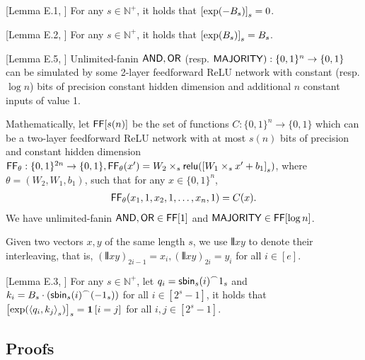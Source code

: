%

\begin{lemma}\label{lem:exp_rounding}[Lemma E.1, \citep{li2024chain}]
	For any $s\in\mathbb{N}^+$, it holds that $\left[\exp(-B_s)\right]_s = 0$.
\end{lemma}

\begin{lemma}\label{lem:exp_rounding_up}[Lemma E.2, \citep{li2024chain}]
	For any $s\in\mathbb{N}^+$, it holds that $\left[\exp(B_s)\right]_s = B_s$.
\end{lemma}

\begin{lemma}\label{lem:FB_simulating_boolean_gates}[Lemma E.5, \citep{li2024chain}]
Unlimited-fanin $\mathsf{AND},\mathsf{OR}$ (resp. $\mathsf{MAJORITY}) :\{0,1\}^n\to \{0,1\}$ can be simulated by some 2-layer feedforward ReLU network with constant (resp. $\log n$) bits of precision constant hidden dimension and additional $n$ constant inputs of value 1. 

Mathematically, let $\mathsf{FF}[s(n)]$ be the set of functions $C:\{0,1\}^n\to\{0,1\}$ which can be a two-layer feedforward ReLU network with at most $s(n)$ bits of precision and constant hidden dimension $\mathsf{FF}_{\theta}:\{0,1\}^{2n}\to \{0,1\}, \mathsf{FF}_{\theta}(x') = W_2\times_s\mathsf{relu}(\left[W_1\times_s x'+b_1\right]_s)$, where $\theta = (W_2,W_1,b_1)$, such that for any $x\in\{0,1\}^n$, 
\begin{align}
\mathsf{FF}_\theta(x_1,1,x_2,1,\ldots,x_n,1) = C(x).	
\end{align}
We have unlimited-fanin $\mathsf{AND},\mathsf{OR}\in \mathsf{FF}[1]$ and $\mathsf{MAJORITY}\in \mathsf{FF}[\log n]$.  
\end{lemma}

Given two vectors $x,y$ of the same length $s$, we use $\interleave{x}{y}$ to denote their interleaving, that is, $(\interleave{x}{y})_{2i-1} = x_i, (\interleave{x}{y})_{2i} = y_i$ for all $i\in [e]$. 
\begin{lemma}\label{lem:attention_rounding}[Lemma E.3, \citep{li2024chain}]
	For any $s\in\mathbb{N}^+$, let $q_i = {\mathsf{sbin}_s(i)}^\frown{1_s}$ and $k_i = B_s\cdot ({\mathsf{sbin}_s(i)}^\frown{(-1_s)})$ for all $i\in [2^s-1]$, it holds that $\left[\exp(\left\langle q_i,k_j \right\rangle_s)\right]_s=\bm{1}\left[i=j\right]$ for all $i,j\in [2^s-1]$.
\end{lemma}

\subsection{Proofs}


